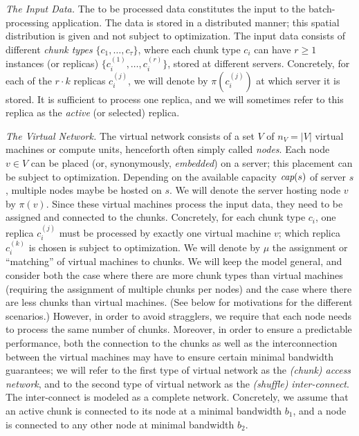 \documentclass[9pt]{sigcomm-alternate}
\newcommand{\ChunkType}{\tau}
\newcommand{\VirtualNodes}{\ensuremath{V}}
\newcommand{\achunk}{\ensuremath{c}}
\newcommand{\capacity}{\emph{cap}}
\newcommand{\CostTrans}{\ensuremath{b_1}}
\newcommand{\CostCom}{\ensuremath{b_2}}
\begin{document}
\emph{The Input Data.} The to be processed data constitutes the input to the batch-processing application.
The data is stored in a distributed manner; this spatial distribution is given and not subject to optimization.
The input data consists of different \emph{chunk types} $\{\achunk_1, \ldots, \achunk_{\ChunkType}\}$,
where each chunk type $\achunk_i$ can have $r\geq 1$ instances (or replicas) $\{\achunk_{i}^{(1)},\ldots, \achunk_{i}^{(r)}\}$,
 stored at different servers.
Concretely, for each of the $r\cdot k$ replicas $\achunk_{i}^{(j)}$, we will denote by $\pi(\achunk_{i}^{(j)})$ at
which server it is stored. It is sufficient to process one replica, and we will sometimes refer to this
replica as the \emph{active} (or selected) replica.

\emph{The Virtual Network.} The virtual network consists of a set $\VirtualNodes$ of $n_V=|\VirtualNodes|$ virtual machines or compute
 units, henceforth often simply called \emph{nodes}.
Each node $v \in \VirtualNodes$ can be placed (or, synonymously, \emph{embedded}) on a server; this placement can be subject
to optimization.
Depending on the available capacity $\capacity(s)$ of server $s$, multiple nodes maybe be hosted on $s$.
We will denote the server hosting node $v$ by $\pi(v)$.
Since these virtual machines process the input data, they need to be assigned and connected to the
chunks. Concretely, for each chunk type $\achunk_i$, one replica $\achunk_{i}^{(j)}$ must be processed by exactly one virtual machine $v$;
which replica $\achunk_{i}^{(k)}$ is chosen is subject to optimization.
We will denote by $\mu$ the assignment or ``matching'' of virtual machines to chunks.
We will keep the model general, and consider both the case where there are more chunk types
than virtual machines (requiring the assignment of multiple chunks per nodes) and the case
where there are less chunks than virtual machines. (See below for motivations for the different scenarios.)
However, in order to avoid stragglers, we require that each node needs to process the same number of chunks.
Moreover, in order to ensure a predictable performance, both the connection to the chunks
as well as the interconnection between the virtual machines may have to ensure certain
minimal bandwidth guarantees; we will refer to the first type of virtual network as the \emph{(chunk) access
network}, and to the second type of virtual network as the \emph{(shuffle) inter-connect}. The inter-connect 
is modeled as a complete network. Concretely, we assume that an  active chunk
is connected to its node at a minimal bandwidth $\CostTrans$, and a node is connected to any other node
at minimal bandwidth $\CostCom$.
\end{document}
